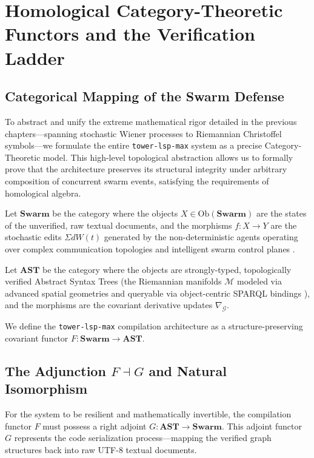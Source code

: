 \chapter{Homological Category-Theoretic Functors and the Verification Ladder}
\label{ch:generative_functors}

\section{Categorical Mapping of the Swarm Defense}

To abstract and unify the extreme mathematical rigor detailed in the previous chapters—spanning stochastic Wiener processes to Riemannian Christoffel symbols—we formulate the entire \texttt{tower-lsp-max} system as a precise Category-Theoretic model. This high-level topological abstraction allows us to formally prove that the architecture preserves its structural integrity under arbitrary composition of concurrent swarm events, satisfying the requirements of homological algebra.

Let $\mathbf{Swarm}$ be the category where the objects $X \in \text{Ob}(\mathbf{Swarm})$ are the states of the unverified, raw textual documents, and the morphisms $f: X \to Y$ are the stochastic edits $\Sigma dW(t)$ generated by the non-deterministic agents operating over complex communication topologies \cite{g_designer_2024} and intelligent swarm control planes \cite{knowledge_control_swarm_2024}. 

Let $\mathbf{AST}$ be the category where the objects are strongly-typed, topologically verified Abstract Syntax Trees (the Riemannian manifolds $\mathcal{M}$ modeled via advanced spatial geometries \cite{vlm_geometry_2024} and queryable via object-centric SPARQL bindings \cite{object_centric_sparql_2024}), and the morphisms are the covariant derivative updates $\nabla_{\mathcal{G}}$.

We define the \texttt{tower-lsp-max} compilation architecture as a structure-preserving covariant functor $F : \mathbf{Swarm} \to \mathbf{AST}$.

\section{The Adjunction $F \dashv G$ and Natural Isomorphism}

For the system to be resilient and mathematically invertible, the compilation functor $F$ must possess a right adjoint $G : \mathbf{AST} \to \mathbf{Swarm}$. This adjoint functor $G$ represents the code serialization process—mapping the verified graph structures back into raw UTF-8 textual documents. 

